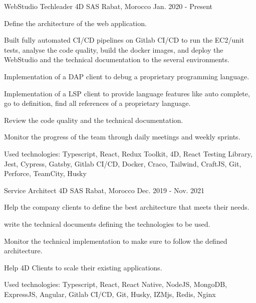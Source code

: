 

\begin{cventries}

  \cventry
    {WebStudio Techleader} %
    {4D SAS} %
    {Rabat, Morocco} %
    {Jan. 2020 - Present} %
    {
      \begin{cvitems} %
        \item {Define the architecture of the web application.}
        \item {Built fully automated CI/CD pipelines on Gitlab CI/CD to run the EC2/unit tests, analyse the code quality, build the docker images, and deploy the WebStudio and the technical documentation to the several environments.}
        \item {Implementation of a DAP client to debug a proprietary programming language.}
        \item {Implementation of a LSP client to provide language features like auto complete, go to definition, find all references of a proprietary language.}
        \item {Review the code quality and the technical documentation.}
        \item {Monitor the progress of the team through daily meetings and weekly sprints.}
        \item {Used technologies: Typescript, React, Redux Toolkit, 4D, React Testing Library, Jest, Cypress, Gatsby, Gitlab CI/CD, Docker, Craco, Tailwind, CraftJS, Git, Perforce, TeamCity, Husky}
      \end{cvitems}
    }

  \cventry
    {Service Architect} %
    {4D SAS} %
    {Rabat, Morocco} %
    {Dec. 2019 - Nov. 2021} %
    {
      \begin{cvitems} %
        \item {Help the company clients to define the best architecture that meets their needs.}
        \item {write the technical documents defining the technologies to be used.}
        \item {Monitor the technical implementation to make sure to follow the defined architecture.}
        \item {Help 4D Clients to scale their existing applications.}
        \item {Used technologies: Typescript, React, React Native, NodeJS, MongoDB, ExpressJS, Angular, Gitlab CI/CD, Git, Husky, IZMjs, Redis, Nginx}
      \end{cvitems}
    }


\end{cventries}
